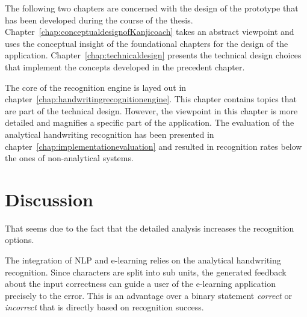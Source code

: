 The following two chapters are concerned with the design of the prototype
that has been developed during the course of the thesis.
Chapter~\ref{chap:conceptualdesignofKanjicoach} takes an abstract viewpoint 
and uses the conceptual insight of the foundational chapters for the 
design of the application. Chapter~\ref{chap:technicaldesign} presents the 
technical design choices that implement the concepts developed in the
precedent chapter.

The core of the recognition engine is layed out in 
chapter~\ref{chap:handwritingrecognitionengine}. This chapter contains topics
that are part of the technical design. However, the viewpoint in this chapter
is more detailed and magnifies a specific part of the application.
The evaluation of the analytical handwriting recognition has been
presented in chapter~\ref{chap:implementationevaluation} and resulted in 
recognition rates below the ones of non-analytical systems. 

\section{Discussion}
\label{sec:conclusion:discussion}


That seems due to
the fact that the detailed analysis increases the recognition options.

The integration of NLP and e-learning relies on the analytical handwriting
recognition. Since characters are split into sub units, the generated feedback 
about the input correctness can guide a user of the e-learning application 
precisely to the error. This is an advantage over a binary statement 
\emph{correct} or \emph{incorrect} that is directly based on recognition success.



